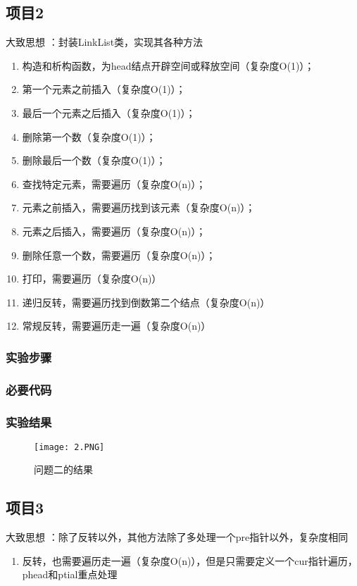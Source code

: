 \subsection{项目2}
大致思想 ：封装LinkList类，实现其各种方法
\begin{enumerate}
\item 构造和析构函数，为head结点开辟空间或释放空间（复杂度O(1)）；
\item 第一个元素之前插入（复杂度O(1)）；
\item 最后一个元素之后插入（复杂度O(1)）；
\item 删除第一个数（复杂度O(1)）；
\item 删除最后一个数（复杂度O(1)）；
\item 查找特定元素，需要遍历（复杂度O(n)）；
\item 元素之前插入，需要遍历找到该元素（复杂度O(n)）；
\item 元素之后插入，需要遍历（复杂度O(n)）；
\item 删除任意一个数，需要遍历（复杂度O(n)）；
\item 打印，需要遍历（复杂度O(n)）
\item 递归反转，需要遍历找到倒数第二个结点（复杂度O(n)）
\item 常规反转，需要遍历走一遍（复杂度O(n)）
\end{enumerate}

\subsubsection{实验步骤}
\subsubsection{必要代码}

\subsubsection{实验结果}
	\begin{figure}[!bthp]
	\centering
        \texttt{[image: 2.PNG]}
        \caption{问题二的结果}
      \end{figure}



\subsection{项目3}
大致思想 ：除了反转以外，其他方法除了多处理一个pre指针以外，复杂度相同
\begin{enumerate}
\item 反转，也需要遍历走一遍（复杂度O(n)），但是只需要定义一个cur指针遍历，phead和ptial重点处理
\end{enumerate}
